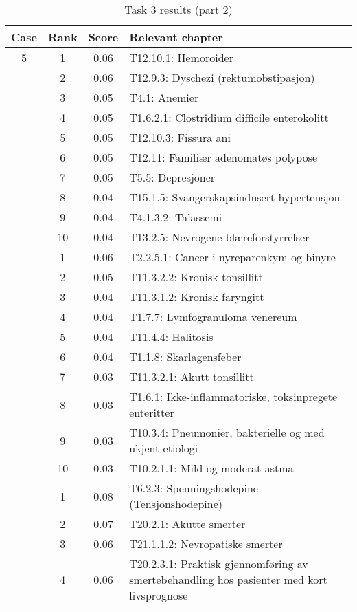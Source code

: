 \begin{table}[htbp] \footnotesize \center
\caption{Task 3 results (part 2)\label{tab:task3b}}
\begin{tabularx}{\textwidth}{c c c X}
    \toprule
    Case & Rank & Score & Relevant chapter \\
    \midrule
    5 & 1 & 0.06 & T12.10.1: Hemoroider \\
     & 2 & 0.06 & T12.9.3: Dyschezi (rektumobstipasjon) \\
     & 3 & 0.05 & T4.1: Anemier \\
     & 4 & 0.05 & T1.6.2.1: Clostridium difficile enterokolitt \\
     & 5 & 0.05 & T12.10.3: Fissura ani \\
     & 6 & 0.05 & T12.11: Familiær adenomatøs polypose \\
     & 7 & 0.05 & T5.5: Depresjoner \\
     & 8 & 0.04 & T15.1.5: Svangerskapsindusert hypertensjon \\
     & 9 & 0.04 & T4.1.3.2: Talassemi \\
     & 10 & 0.04 & T13.2.5: Nevrogene blæreforstyrrelser \\
	\addlinespace
    6 & 1 & 0.06 & T2.2.5.1: Cancer i nyreparenkym og binyre \\
     & 2 & 0.05 & T11.3.2.2: Kronisk tonsillitt \\
     & 3 & 0.04 & T11.3.1.2: Kronisk faryngitt \\
     & 4 & 0.04 & T1.7.7: Lymfogranuloma venereum \\
     & 5 & 0.04 & T11.4.4: Halitosis \\
     & 6 & 0.04 & T1.1.8: Skarlagensfeber \\
     & 7 & 0.03 & T11.3.2.1: Akutt tonsillitt \\
     & 8 & 0.03 & T1.6.1: Ikke-inflammatoriske, toksinpregete enteritter \\
     & 9 & 0.03 & T10.3.4: Pneumonier, bakterielle og med ukjent etiologi \\
     & 10 & 0.03 & T10.2.1.1: Mild og moderat astma \\
	\addlinespace
    7 & 1 & 0.08 & T6.2.3: Spenningshodepine (Tensjonshodepine) \\
     & 2 & 0.07 & T20.2.1: Akutte smerter \\
     & 3 & 0.06 & T21.1.1.2: Nevropatiske smerter \\
     & 4 & 0.06 & T20.2.3.1: Praktisk gjennomføring av smertebehandling hos pasienter med kort livsprognose \\

\end{tabularx}
\end{table}
